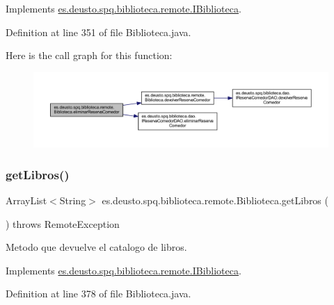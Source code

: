 Implements \mbox{\hyperlink{interfacees_1_1deusto_1_1spq_1_1biblioteca_1_1remote_1_1_i_biblioteca_a36db52ba728865b02b2f25024d942149}{es.\+deusto.\+spq.\+biblioteca.\+remote.\+I\+Biblioteca}}.



Definition at line 351 of file Biblioteca.\+java.

Here is the call graph for this function\+:
\nopagebreak
\begin{figure}[H]
\begin{center}
\leavevmode
\includegraphics[width=350pt]{classes_1_1deusto_1_1spq_1_1biblioteca_1_1remote_1_1_biblioteca_a83e80de66b9deeec2c025a8443df515a_cgraph}
\end{center}
\end{figure}
\mbox{\label{classes_1_1deusto_1_1spq_1_1biblioteca_1_1remote_1_1_biblioteca_a9af87498dad047e3b371f17b3d29bcff}} 
\subsubsection{\texorpdfstring{get\+Libros()}{getLibros()}}
{\footnotesize\ttfamily Array\+List$<$String$>$ es.\+deusto.\+spq.\+biblioteca.\+remote.\+Biblioteca.\+get\+Libros (\begin{DoxyParamCaption}{ }\end{DoxyParamCaption}) throws Remote\+Exception}

Metodo que devuelve el catalogo de libros. 

Implements \mbox{\hyperlink{interfacees_1_1deusto_1_1spq_1_1biblioteca_1_1remote_1_1_i_biblioteca_a84e7d607d76ccc999d384d967987ebd8}{es.\+deusto.\+spq.\+biblioteca.\+remote.\+I\+Biblioteca}}.



Definition at line 378 of file Biblioteca.\+java.

